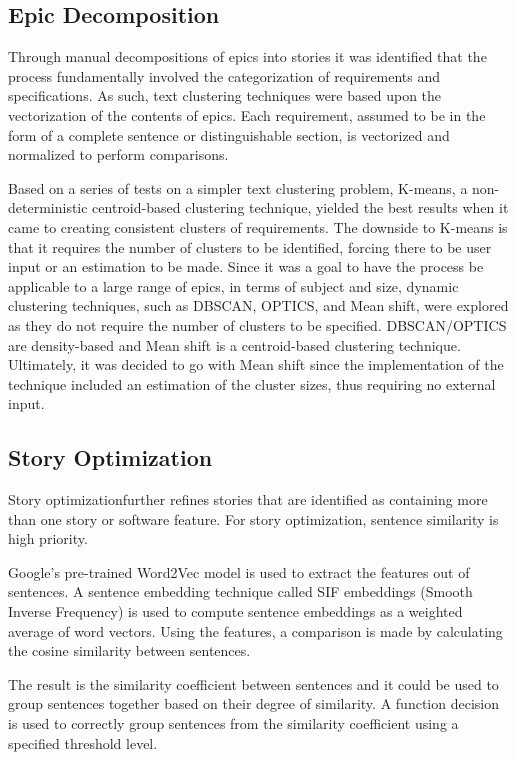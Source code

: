 \subsection{Epic Decomposition}
Through manual decompositions of epics into stories it was identified that the process fundamentally involved the categorization of requirements and specifications. As such, text clustering techniques were based upon the vectorization of the contents of epics. Each requirement, assumed to be in the form of a complete sentence or distinguishable section, is vectorized and normalized to perform comparisons.

Based on a series of tests on a simpler text clustering problem, K-means, a non-deterministic centroid-based clustering technique, yielded the best results when it came to creating consistent clusters of requirements. The downside to K-means is that it requires the number of clusters to be identified, forcing there to be user input or an estimation to be made. Since it was a goal to have the process be applicable to a large range of epics, in terms of subject and size, dynamic clustering techniques, such as DBSCAN, OPTICS, and Mean shift, were explored as they do not require the number of clusters to be specified. DBSCAN/OPTICS are density-based and Mean shift is a centroid-based clustering technique. Ultimately, it was decided to go with Mean shift since the implementation of the technique included an estimation of the cluster sizes, thus requiring no external input.

\subsection{Story Optimization}
Story optimizationfurther refines stories that are identified as containing more than one story or software feature. For story optimization, sentence similarity is high priority. 

Google's pre-trained Word2Vec model\cite{googleword2vec} is used to extract the features out of sentences. A sentence embedding technique called SIF embeddings (Smooth Inverse Frequency) is used to compute sentence embeddings as a weighted average of word vectors. Using the features, a comparison is made by calculating the cosine similarity between sentences. 

The result is the similarity coefficient between sentences and it could be used to group sentences together based on their degree of similarity. A function decision is used to correctly group sentences from the similarity coefficient using a specified threshold level. 

